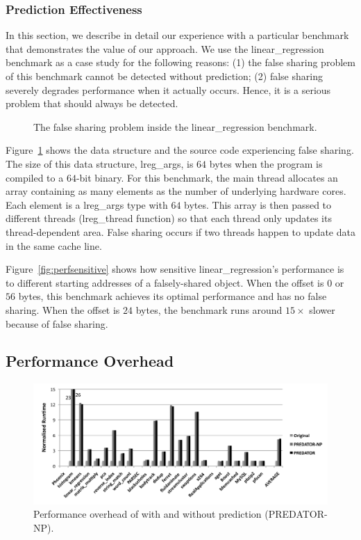 \subsubsection{Prediction Effectiveness}
\label{sec:predicteval}
In this section, we describe in detail our experience with a particular benchmark that demonstrates the value of our approach. We use the linear\_regression benchmark as a case study for the following reasons: (1) the false sharing problem of this benchmark cannot be detected without prediction; (2) false sharing severely degrades performance when it actually occurs. Hence, it is a serious problem that should always be detected. 

\begin{figure}[!t]
{\centering
\subfigure{}
\caption{The false sharing problem inside the linear\_regression benchmark.
\label{fig:linearregression}}
}
\end{figure}

Figure~\ref{fig:linearregression} shows the data structure and the source code experiencing false sharing. The size of this data structure, lreg\_args, is $64$ bytes 
when the program is compiled to a $64$-bit binary. For this benchmark, the main thread allocates an array containing as many elements as the number of underlying hardware cores. Each element is a lreg\_args type with $64$ bytes. This array is then passed to different threads (lreg\_thread function) so that each thread only updates its thread-dependent area. False sharing occurs if two threads happen to update data in the same cache line. 

Figure~\ref{fig:perfsensitive} shows how sensitive linear\_regression's performance is to different starting addresses of a falsely-shared object. When the offset is $0$ or $56$ bytes, this benchmark achieves its optimal performance and has no false sharing. When the offset is $24$ bytes, the benchmark runs around $15\times$ slower because of false sharing.

\subsection{Performance Overhead}
\label{sec:perfoverhead}

\begin{figure}[!t]
\begin{center}
\includegraphics[width=6.5in]{fig/perf}
\end{center}
\caption{
Performance overhead of \Predator{} with and without prediction (PREDATOR-NP).
\label{fig:perf}}
\end{figure}


